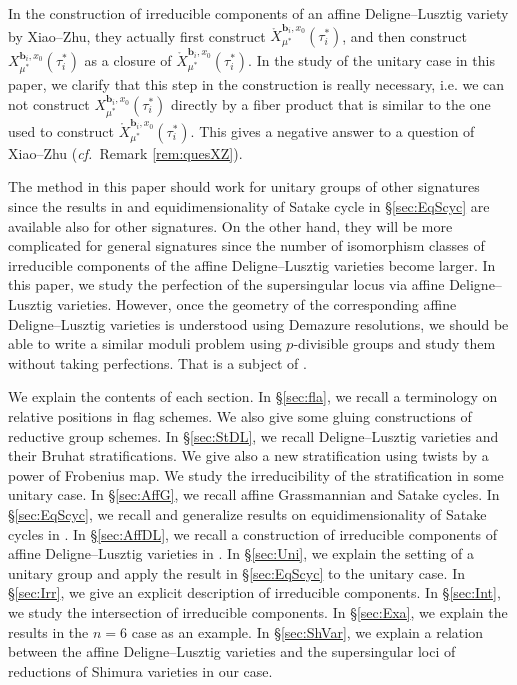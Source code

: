 \documentclass[12pt,a4paper]{article}
\newcommand{\bfb}{\mathbf{b}}
\newcommand{\cf}{\textit{cf.\ }}
\begin{document}
In the construction of 
irreducible components of an 
affine Deligne--Lusztig variety by Xiao--Zhu, they actually first construct 
$\mathring{X}_{\mu^*}^{\bfb_i,x_0}(\tau_i^*)$, and then construct 
$X_{\mu^*}^{\bfb_i,x_0}(\tau_i^*)$ 
as a closure of $\mathring{X}_{\mu^*}^{\bfb_i,x_0}(\tau_i^*)$. In the study of the unitary case in this paper, we clarify that this step in the construction is really necessary, i.e. 
we can not construct $X_{\mu^*}^{\bfb_i,x_0}(\tau_i^*)$ directly by a fiber product that is similar to the one used to construct $\mathring{X}_{\mu^*}^{\bfb_i,x_0}(\tau_i^*)$. 
This gives a negative answer to a question of Xiao--Zhu (\cf Remark \ref{rem:quesXZ}). 

The method in this paper should work for unitary groups of other signatures since the results in \cite{XiZhCycSh} and equidimensionality of Satake cycle in \S \ref{sec:EqScyc} 
are available also for other signatures. 
On the other hand, they will be more complicated for general signatures since 
the number of isomorphism classes of irreducible components of the affine Deligne--Lusztig varieties become larger. 
In this paper, we study the perfection of the supersingular locus via affine Deligne--Lusztig varieties. However, once the geometry of the corresponding affine Deligne--Lusztig varieties is understood using Demazure resolutions, we should be able to write a similar moduli problem using $p$-divisible groups and study them without taking perfections. 
That is a subject of \cite{FHIRZG}.

We explain the contents of each section. 
In \S \ref{sec:fla}, 
we recall a terminology on relative positions in flag schemes. 
We also give some gluing constructions of reductive group schemes.  
In \S \ref{sec:StDL}, 
we recall Deligne--Lusztig varieties and their Bruhat stratifications. 
We give also a new stratification 
using twists by a power of Frobenius map. 
We study the irreducibility of the stratification 
in some unitary case. 
In \S \ref{sec:AffG}, 
we recall affine Grassmannian and Satake cycles. 
In \S \ref{sec:EqScyc}, 
we recall and generalize 
results on equidimensionality of Satake cycles in 
\cite{HaiEquconv}. 
In \S \ref{sec:AffDL}, 
we recall a construction of irreducible components of 
affine Deligne--Lusztig varieties in \cite{XiZhCycSh}. 
In \S \ref{sec:Uni}, 
we explain the setting of a unitary group and 
apply the result in \S \ref{sec:EqScyc} to the unitary case.  
In \S \ref{sec:Irr}, 
we give an explicit description of irreducible components. 
In \S \ref{sec:Int}, 
we study the intersection of irreducible components. 
In \S \ref{sec:Exa}, 
we explain the results in the $n=6$ case as an example.   
In \S \ref{sec:ShVar}, 
we explain a relation between the 
affine Deligne--Lusztig varieties and the 
supersingular loci of reductions of Shimura varieties 
in our case. 
\end{document}
